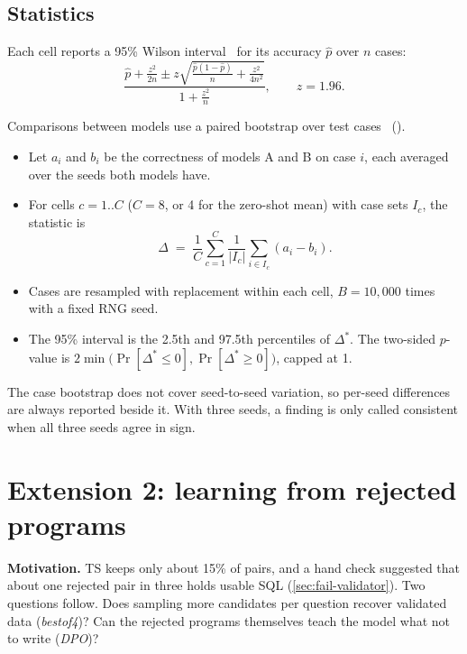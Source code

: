 \subsection{Statistics}\label{sec:stats}

Each cell reports a 95\% Wilson interval~\cite{wilson1927} for its accuracy $\hat p$ over $n$ cases:
\begin{equation}
  \frac{\hat p + \frac{z^2}{2n} \pm z\sqrt{\frac{\hat p(1-\hat p)}{n}+\frac{z^2}{4n^2}}}{1+\frac{z^2}{n}},\qquad z=1.96.
\end{equation}

Comparisons between models use a paired bootstrap over test cases~\cite{efron1993bootstrap}
().
\begin{itemize}
\item Let $a_i$ and $b_i$ be the correctness of models A and B on case $i$, each averaged over the seeds both models
have.
\item For cells $c=1..C$ ($C=8$, or 4 for the zero-shot mean) with case sets $I_c$, the statistic is
\begin{equation}
  \Delta \;=\; \frac{1}{C}\sum_{c=1}^{C}\frac{1}{|I_c|}\sum_{i\in I_c}(a_i-b_i).
\end{equation}
\item Cases are resampled with replacement within each cell, $B=10{,}000$ times with a fixed RNG seed.
\item The 95\% interval is the 2.5th and 97.5th percentiles of $\Delta^\ast$. The two-sided $p$-value is $2\min\bigl(\Pr[\Delta^\ast\le 0],\Pr[\Delta^\ast\ge
0]\bigr)$, capped at 1.
\end{itemize}
The case bootstrap does not cover seed-to-seed variation, so per-seed differences are always reported beside it. With
three seeds, a finding is only called consistent when all three seeds agree in sign.

\section{Extension 2: learning from rejected programs}\label{sec:method-ext2}

\begin{oursbox}[title={Our extension (not in the paper)}]
\textbf{Motivation.} TS keeps only about 15\% of pairs, and a hand check suggested that about one rejected pair in three
holds usable SQL (\cref{sec:fail-validator}). Two questions follow. Does sampling more candidates per question recover
validated data (\emph{bestof4})? Can the rejected programs themselves teach the model what not to write (\emph{DPO})?
\end{oursbox}

